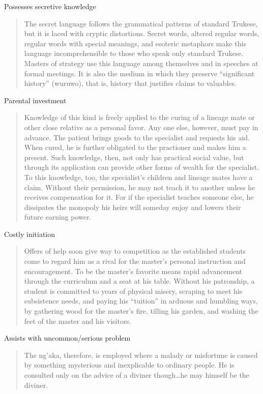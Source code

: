 \documentclass[
]{article}
\begin{document}
Possesses secretive knowledge

\begin{quote}
The secret language follows the grammatical patterns of standard Trukese, but it is laced with cryptic distortions. Secret words, altered regular words, regular words with special meanings, and esoteric metaphors make this language incomprehensible to those who speak only standard Trukese. Masters of strategy use this language among themselves and in speeches at formal meetings. It is also the medium in which they preserve ``significant history'' (wuruwo), that is, history that justifies claims to valuables.
\end{quote}

Parental investment

\begin{quote}
Knowledge of this kind is freely applied to the curing of a lineage mate or other close relative as a personal favor. Any one else, however, must pay in advance. The patient brings goods to the specialist and requests his aid. When cured, he is further obligated to the practioner and makes him a present. Such knowledge, then, not only has practical social value, but through its application can provide other forms of wealth for the specialist. To this knowledge, too, the specialist's children and lineage mates have a claim. Without their permission, he may not teach it to another unless he receives compensation for it. For if the specialist teaches someone else, he dissipates the monopoly his heirs will someday enjoy and lowers their future earning power.
\end{quote}

Costly initiation

\begin{quote}
Offers of help soon give way to competition as the established students come to regard him as a rival for the master's personal instruction and encouragement. To be the master's favorite means rapid advancement through the curriculum and a seat at his table. Without his patronship, a student is committed to years of physical misery, scraping to meet his subsistence needs, and paying his ``tuition'' in arduous and humbling ways, by gathering wood for the master's fire, tilling his garden, and washing the feet of the master and his visitors.
\end{quote}

Assists with uncommon/serious problem

\begin{quote}
The ng'aka, therefore, is employed where a malady or misfortune is caused by something mysterious and inexplicable to ordinary people. He is consulted only on the advice of a diviner though\ldots he may himself be the diviner.
\end{quote}
\end{document}

